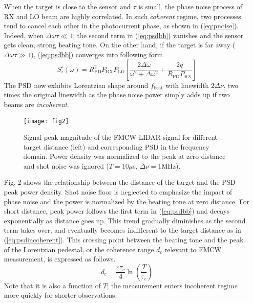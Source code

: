 \documentclass{article}
\begin{document}
When the target is close to the sensor and $\tau$ is small, the phase noise process of RX and LO beam are highly correlated. In such \textit{coherent} regime, two processes tend to cancel each other in the photocurrent phase, as shown in (\ref{eq:pnoise}). Indeed, when $\Delta\omega\tau\ll 1$, the second term in (\ref{eq:psdbb}) vanishes and the sensor gets clean, strong beating tone. On the other hand, if the target is far away ($\Delta\omega\tau\gg 1$), (\ref{eq:psdbb}) converges into following form.
\begin{equation}\label{eq:psdincoherent}
S_{i}^\circ(\omega) = R_\text{PD}^2 P_\text{RX} P_\text{LO} \left[\frac{2\Delta\omega}{\omega^2+\Delta\omega^2} + \frac{2q}{R_\text{PD}P_\text{RX}} \right]
\end{equation}
The PSD now exhibits Lorentzian shape around $f_\text{beat}$ with linewidth $2\Delta\nu$, two times the original linewidth as the phase noise power simply adds up if two beams are \textit{incoherent}.


\begin{figure}[t!]
\begin{minipage}[b]{1.0\linewidth}
  \centering
  \centerline{\texttt{[image: fig2]}}
  \vspace{-1em}
\end{minipage}
\caption{Signal peak magnitude of the FMCW LIDAR signal for different target distance (left) and corresponding PSD in the frequency domain. Power density was normalized to the peak at zero distance and shot noise was ignored ($T=$10$\mu$s, $\Delta\nu=$1MHz).}
  \vspace{-1em}
\label{fig:psd}
\end{figure}

Fig. 2 shows the relationship between the distance of the target and the PSD peak power density. Shot noise floor is neglected to emphasize the impact of phase noise and the power is normalized by the beating tone at zero distance. For short distance, peak power follows the first term in (\ref{eq:psdbb}) and decays exponentially as distance goes up. This trend gradually diminishes as the second term takes over, and eventually becomes indifferent to the target distance as in (\ref{eq:psdincoherent}). This crossing point between the beating tone and the peak of the Lorentzian pedestal, or the coherence range $d_c$ relevant to FMCW measurement, is expressed as follows.
\begin{equation}\label{eq:coherentcrossing}
d_c = \frac{c\tau_c}{4}\ln{\left(\frac{T}{\tau_c}\right)}
\end{equation}
Note that it is also a function of $T$; the measurement enters incoherent regime more quickly for shorter observations.
\end{document}
